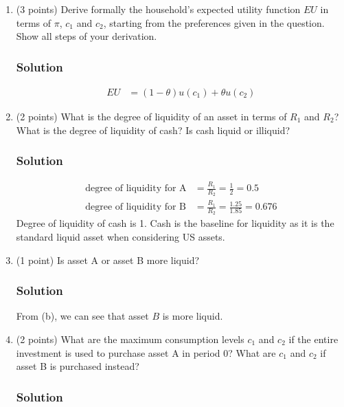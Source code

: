 \documentclass[12pt]{article}
\begin{document}
\begin{enumerate}[label=(\alph*)]
    \item (3 points) Derive formally the household’s expected utility function $EU$ in terms of $\pi$, $c_1$ and $c_2$, starting from the preferences given in the question. Show all steps of your derivation.

    \subsubsection*{Solution}
    \begin{align*}
         EU &= (1 - \theta)u(c_1) + \theta u(c_2)
    \end{align*}

    \item (2 points) What is the degree of liquidity of an asset in terms of $R_1$ and $R_2$? What is the degree of liquidity of cash? Is cash liquid or illiquid?
    \subsubsection*{Solution}

    \begin{align*}
        \text{degree of liquidity for A} &= \frac{R_1}{R_2} = \frac{1}{2} = 0.5
        \\ \text{degree of liquidity for B} &= \frac{R_1}{R_2} = \frac{1.25}{1.85} = 0.676
    \end{align*}
    Degree of liquidity of cash is 1. Cash is the baseline for liquidity as it is the standard liquid asset when considering US assets. 
    

    \item (1 point) Is asset A or asset B more liquid?
    \subsubsection*{Solution}

    From (b), we can see that asset $B$ is more liquid. 

    \item (2 points) What are the maximum consumption levels $c_1$ and $c_2$ if the entire investment is used to purchase asset A in period 0? What are $c_1$ and $c_2$ if asset B is purchased instead?
    \subsubsection*{Solution}


\end{enumerate}
\end{document}
